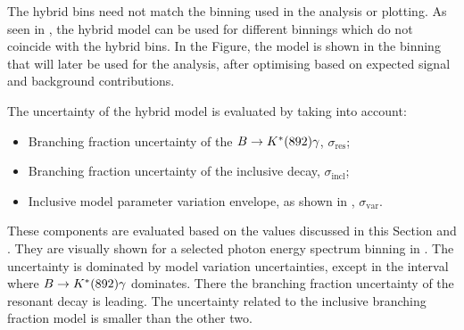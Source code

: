The hybrid bins need not match the binning used in the analysis or plotting.
As seen in , the hybrid model can be used for different binnings which do not coincide with the hybrid bins.
In the Figure, the model is shown in the binning that will later be used for the analysis, after optimising based on expected signal and background contributions.

The uncertainty of the hybrid model is evaluated by taking into account:
\begin{itemize}
    \item Branching fraction uncertainty of the $B\rightarrow K^*(892)\gamma$, $\sigma_{\mathrm{res}}$;
    \item Branching fraction uncertainty of the inclusive \BtoXsgamma decay, $\sigma_{\mathrm{incl}}$;
    \item Inclusive model parameter variation envelope, as shown in , $\sigma_{\mathrm{var}}$.
\end{itemize}
These components are evaluated based on the values discussed in this Section and .
They are visually shown for a selected \BtoXsgamma photon energy spectrum binning in .
The uncertainty is dominated by \BtoXsgamma model variation uncertainties, except in the interval where $B\rightarrow K^*(892)\gamma$ dominates.
There the branching fraction uncertainty of the resonant decay is leading.
The uncertainty related to the \BtoXsgamma inclusive branching fraction model is smaller than the other two.

